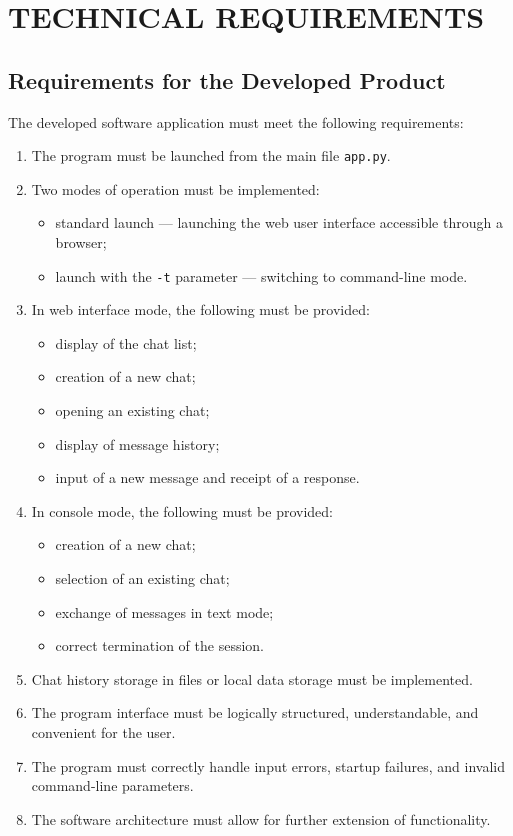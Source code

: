 \documentclass[12pt,a4paper]{article}
\begin{document}
    \section{TECHNICAL REQUIREMENTS}

    \subsection{Requirements for the Developed Product}

    The developed software application must meet the following requirements:

    \begin{enumerate}
        \item The program must be launched from the main file \texttt{app.py}.
        \item Two modes of operation must be implemented:
        \begin{itemize}
            \item standard launch --- launching the web user interface accessible through a browser;
            \item launch with the \texttt{-t} parameter --- switching to command-line mode.
        \end{itemize}
        \item In web interface mode, the following must be provided:
        \begin{itemize}
            \item display of the chat list;
            \item creation of a new chat;
            \item opening an existing chat;
            \item display of message history;
            \item input of a new message and receipt of a response.
        \end{itemize}
        \item In console mode, the following must be provided:
        \begin{itemize}
            \item creation of a new chat;
            \item selection of an existing chat;
            \item exchange of messages in text mode;
            \item correct termination of the session.
        \end{itemize}
        \item Chat history storage in files or local data storage must be implemented.
        \item The program interface must be logically structured, understandable, and convenient for the user.
        \item The program must correctly handle input errors, startup failures, and invalid command-line parameters.
        \item The software architecture must allow for further extension of functionality.
    \end{enumerate}
\end{document}
